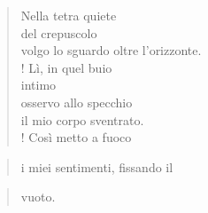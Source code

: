 
\begin{verse}
    Nella tetra quiete\\
    del crepuscolo\\
    volgo lo sguardo oltre l'orizzonte.\\!
    Lì, in quel buio\\
    intimo\\
    osservo allo specchio\\
    il mio corpo sventrato.\\!
    Così metto a fuoco\\
    \end{verse}
\vspace{-0.9cm}
\begin{verse}i miei sentimenti, \hfill fissando il \end{verse}
\vspace{-0.9cm}
\begin{verse}    
    vuoto.
\end{verse}